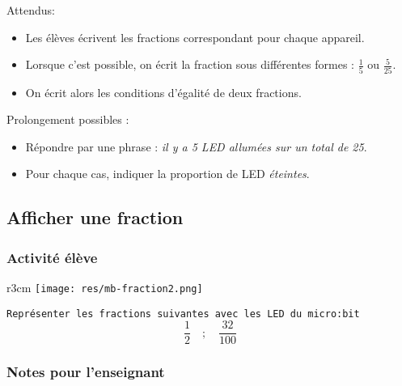 Attendus:

\begin{itemize}
    \item Les élèves écrivent les fractions correspondant pour chaque appareil.
    \item Lorsque c’est possible, on écrit la fraction sous différentes formes : $\frac {1}{5}$ ou $\frac{5}{25}$.
    \item On écrit alors les conditions d’égalité de deux fractions.
\end{itemize}

\begin{remarque}
    Prolongement  possibles :
    \begin{itemize}
        \item Répondre par une phrase : \emph{il y a 5 LED allumées sur un total de 25}.
        \item Pour chaque cas, indiquer la proportion de LED \emph{éteintes}.
    \end{itemize}
\end{remarque}


%
%
\newpage
\subsection{Afficher une fraction}
\subsubsection{Activité élève}


%
%
\begin{wrapfigure}[4]{r}{3cm}
    \texttt{[image: res/mb-fraction2.png]}
\end{wrapfigure}

\begin{eleve}    
    \texttt{Représenter les fractions suivantes avec les LED du micro:bit}
    $$
    \frac{1}{2} \quad ; \quad \frac{32}{100}
    $$
\end{eleve}

%
%
\subsubsection{Notes pour l'enseignant}

